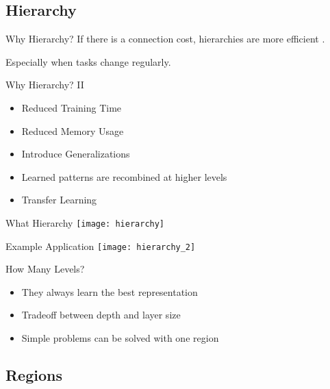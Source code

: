 
\subsection{Hierarchy}


\begin{frame}[c]{Why Hierarchy?}
    \Large
    \pause
    If there is a connection cost, hierarchies are more efficient \cite{mengistu2016evolutionary}. 
    
    \pause
    Especially when tasks change regularly.
\end{frame}


\begin{frame}[c]{Why Hierarchy? II}
    \Large
    \begin{itemize}[<+(1)->]
        \item Reduced Training Time
        \item Reduced Memory Usage
        \item Introduce Generalizations
        \item Learned patterns are recombined at higher levels
        \item Transfer Learning
    \end{itemize}
\end{frame}


\begin{frame}[c]{What Hierarchy}
    \pause
    \texttt{[image: hierarchy]}
\end{frame}


\begin{frame}[c]{Example Application}
    \texttt{[image: hierarchy\_2]} 
\end{frame}


\begin{frame}[c]{How Many Levels?}
    \Large
    \begin{itemize}[<+(1)->]
        \item They always learn the best representation
        \item Tradeoff between depth and layer size
        \item Simple problems can be solved with one region
    \end{itemize}
\end{frame}



\subsection{Regions}


